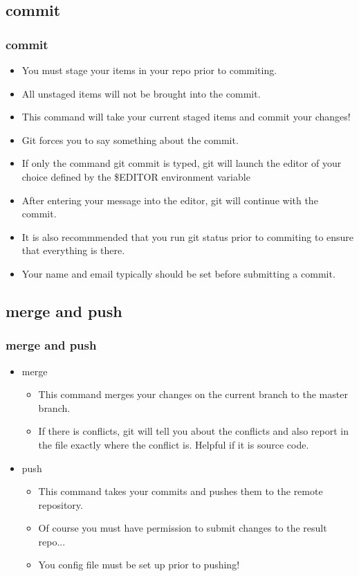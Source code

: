 \documentclass{beamer}
\begin{document}
\subsection{commit}
\begin{frame}
    \frametitle{commit}
    \begin{itemize}
        \item{You must stage your items in your repo prior to commiting.}
        \item{All unstaged items will not be brought into the commit.}
        \item{This command will take your current staged items and commit your changes!}
        \item{Git forces you to say something about the commit.}
        \item{If only the command git commit is typed, git will launch the editor of your choice defined by the \$EDITOR environment variable}
        \item{After entering your message into the editor, git will continue with the commit.}
        \item{It is also recommmended that you run git status prior to commiting to ensure that everything is there.}
        \item{Your name and email typically should be set before submitting a commit.}
    \end{itemize}
\end{frame}

\subsection{merge and push}
\begin{frame}
    \frametitle{merge and push}
    \begin{itemize}
        \item{merge}
        \begin{itemize}
            \item{This command merges your changes on the current branch to the master branch.}
            \item{If there is conflicts, git will tell you about the conflicts and also report in the file exactly where the conflict is. Helpful if it is source code.}
        \end{itemize}

        \item{push}
        \begin{itemize}
            \item{This command takes your commits and pushes them to the remote repository.}
            \item{Of course you must have permission to submit changes to the result repo...}
            \item{You config file must be set up prior to pushing!}
        \end{itemize}

    \end{itemize}
\end{frame}
\end{document}
